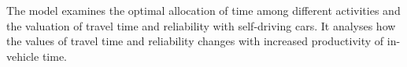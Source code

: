 \documentclass[12pt,a4paper,british]{article}
\begin{document}
The model examines the optimal allocation of time among different activities and the valuation of travel time and reliability with self-driving cars. It analyses how the values of travel time and reliability changes with increased productivity of in-vehicle time.

\clearpage{}





\clearpage{}





\end{document}
